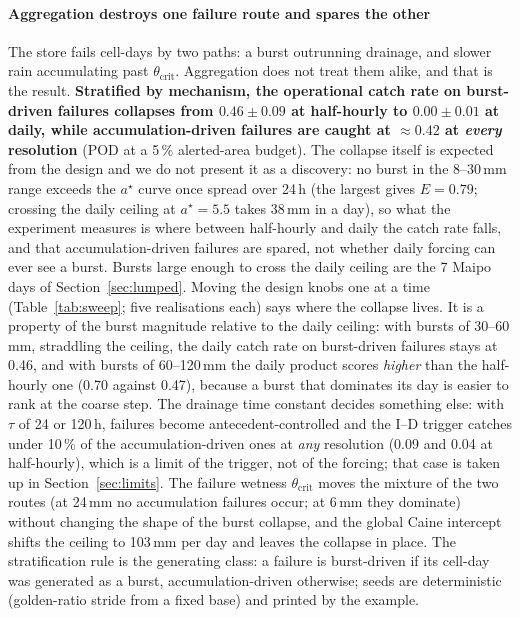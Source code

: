 \documentclass[authoryear,preprint,review,12pt]{elsarticle}
\begin{document}
\paragraph{Aggregation destroys one failure route and spares the other}
The store fails cell-days by two paths: a burst outrunning drainage, and slower
rain accumulating past $\theta_\mathrm{crit}$. Aggregation does not treat them
alike, and that is the result. \textbf{Stratified by mechanism, the operational
catch rate on burst-driven failures collapses from $0.46\pm0.09$ at half-hourly to
$0.00\pm0.01$ at daily, while accumulation-driven failures are caught at
${\approx}0.42$ at \emph{every} resolution} (POD at a 5\,\% alerted-area budget).
The collapse itself is expected from the design and we do not present it as a discovery: no burst in the 8--30\,mm range exceeds the $a^\star$ curve once spread over 24\,h (the largest gives $E=0.79$; crossing the daily ceiling at $a^\star=5.5$ takes 38\,mm in a day), so what the experiment measures is where between half-hourly and daily the catch rate falls, and that accumulation-driven failures are spared, not whether daily forcing can ever see a burst. Bursts large enough to cross the daily ceiling are the 7 Maipo days of Section~\ref{sec:lumped}. Moving the design knobs one at a time (Table~\ref{tab:sweep}; five realisations each) says where the collapse lives. It is a property of the burst magnitude relative to the daily ceiling: with bursts of 30--60\,mm, straddling the ceiling, the daily catch rate on burst-driven failures stays at 0.46, and with bursts of 60--120\,mm the daily product scores \emph{higher} than the half-hourly one (0.70 against 0.47), because a burst that dominates its day is easier to rank at the coarse step. The drainage time constant decides something else: with $\tau$ of 24 or 120\,h, failures become antecedent-controlled and the I--D trigger catches under 10\,\% of the accumulation-driven ones at \emph{any} resolution (0.09 and 0.04 at half-hourly), which is a limit of the trigger, not of the forcing; that case is taken up in Section~\ref{sec:limits}. The failure wetness $\theta_\mathrm{crit}$ moves the mixture of the two routes (at 24\,mm no accumulation failures occur; at 6\,mm they dominate) without changing the shape of the burst collapse, and the global Caine intercept shifts the ceiling to 103\,mm per day and leaves the collapse in place. The stratification rule is the generating class: a failure is burst-driven if its cell-day was generated as a burst, accumulation-driven otherwise; seeds are deterministic (golden-ratio stride from a fixed base) and printed by the example.
\end{document}

